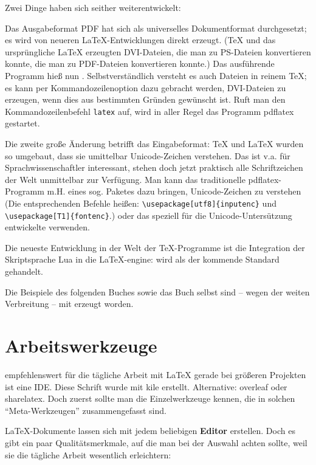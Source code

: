 \documentclass[%
   fontsize=11pt,%
   paper=17cm:24cm,%
   DIV=13,%
   pagesize%
   ]{scrbook}  	%
\newcommand{\LuaLaTeX}{\hologo{LuaLaTeX}}
\newcommand{\pdflatex}{\hologo{pdfLaTeX}}
\newcommand{\XeLaTeX}{\hologo{XeLaTeX}}
\begin{document}
Zwei Dinge haben sich seither weiterentwickelt:

Das Ausgabeformat PDF hat sich als universelles Dokumentformat durchgesetzt; es wird von neueren
\LaTeX-Entwicklungen direkt erzeugt. (\TeX{} und das ursprüngliche \LaTeX{} erzeugten DVI-Dateien,
die man zu PS-Dateien konvertieren konnte, die man zu PDF-Dateien konvertieren konnte.)
Das ausführende Programm hieß nun \pdflatex. 
Selbstverständlich versteht es auch Dateien in reinem \TeX ;
es kann per Kommandozeilenoption dazu gebracht werden, DVI-Dateien zu erzeugen, wenn dies aus 
bestimmten Gründen gewünscht ist.
Ruft man den Kommandozeilenbefehl \lstinline/latex/ auf, wird in aller Regel das Programm 
pdflatex gestartet.

Die zweite große Änderung betrifft das Eingabeformat:
\TeX{} und \LaTeX{} wurden so umgebaut, dass sie umittelbar Unicode-Zeichen verstehen.
Das ist v.a. für Sprachwissenschaftler interessant, stehen doch jetzt praktisch alle Schriftzeichen
der Welt unmittelbar zur Verfügung. 
Man kann das traditionelle pdflatex-Programm m.H. eines sog. Paketes dazu bringen, Unicode-Zeichen
zu verstehen
(Die entsprechenden Befehle heißen: \lstinline/\usepackage[utf8]{inputenc}/ 
und \lstinline/\usepackage[T1]{fontenc}/.)
oder das speziell für die Unicode-Untersützung entwickelte \XeLaTeX{} verwenden.

Die neueste Entwicklung in der Welt der \TeX-Programme ist die Integration der Skriptsprache
Lua in die \LaTeX-engine: \LuaLaTeX{} wird als der kommende Standard gehandelt.

Die Beispiele des folgenden Buches sowie das Buch selbst sind -- wegen der weiten Verbreitung --
mit \pdflatex{} erzeugt worden.

\section{Arbeitswerkzeuge}

empfehlenswert für die tägliche Arbeit mit \LaTeX{} gerade bei größeren Projekten ist eine IDE.
Diese Schrift wurde mit kile erstellt.
Alternative: overleaf oder sharelatex.
Doch zuerst sollte man die Einzelwerkzeuge kennen, die in solchen \enquote{Meta-Werkzeugen}
zusammengefasst sind.


\LaTeX -Dokumente lassen sich mit jedem beliebigen \textbf{Editor} erstellen.
Doch es gibt ein paar Qualitätsmerkmale, auf die man bei der Auswahl achten sollte, weil
sie die tägliche Arbeit wesentlich erleichtern:
\end{document}
